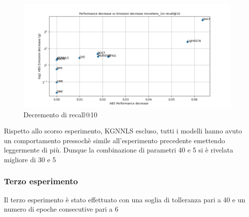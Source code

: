 \begin{figure}[H]
    \centering
     \includegraphics[width=\textwidth]{images/decrement_recall@10_movielens_1m_30_5.png}
    \caption{Decremento di recall@10}
\end{figure}
\noindent Rispetto allo scorso esperimento, KGNNLS escluso, tutti i modelli hanno avuto un comportamento pressochè simile all'esperimento precedente emettendo leggermente di più. Dunque la combinazione di parametri 40 e 5 si è rivelata migliore di 30 e 5

\subsubsection{Terzo esperimento}
Il terzo esperimento è stato effettuato con una soglia di tolleranza pari a 40 e un numero di epoche consecutive pari a 6



